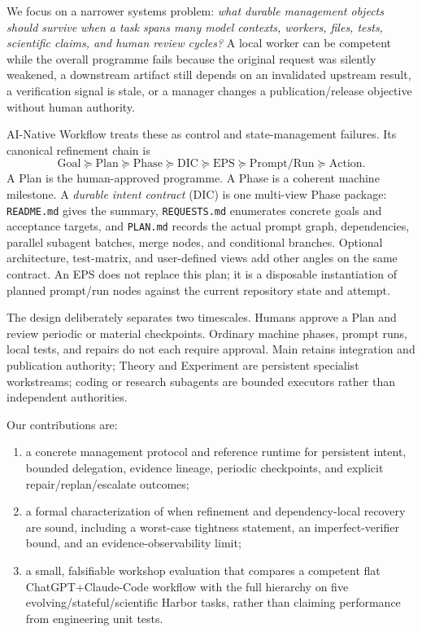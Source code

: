 \documentclass{article}
\begin{document}
We focus on a narrower systems problem: \emph{what durable management objects should survive when a task spans many model contexts, workers, files, tests, scientific claims, and human review cycles?} A local worker can be competent while the overall programme fails because the original request was silently weakened, a downstream artifact still depends on an invalidated upstream result, a verification signal is stale, or a manager changes a publication/release objective without human authority.

AI-Native Workflow treats these as control and state-management failures. Its canonical refinement chain is
\[
\text{Goal}\succeq\text{Plan}\succeq\text{Phase}\succeq\text{DIC}\succeq\text{EPS}\succeq\text{Prompt/Run}\succeq\text{Action}.
\]
A Plan is the human-approved programme. A Phase is a coherent machine milestone. A \emph{durable intent contract} (DIC) is one multi-view Phase package: \texttt{README.md} gives the summary, \texttt{REQUESTS.md} enumerates concrete goals and acceptance targets, and \texttt{PLAN.md} records the actual prompt graph, dependencies, parallel subagent batches, merge nodes, and conditional branches. Optional architecture, test-matrix, and user-defined views add other angles on the same contract. An EPS does not replace this plan; it is a disposable instantiation of planned prompt/run nodes against the current repository state and attempt.

The design deliberately separates two timescales. Humans approve a Plan and review periodic or material checkpoints. Ordinary machine phases, prompt runs, local tests, and repairs do not each require approval. Main retains integration and publication authority; Theory and Experiment are persistent specialist workstreams; coding or research subagents are bounded executors rather than independent authorities.

Our contributions are:
\begin{enumerate}
  \item a concrete management protocol and reference runtime for persistent intent, bounded delegation, evidence lineage, periodic checkpoints, and explicit repair/replan/escalate outcomes;
  \item a formal characterization of when refinement and dependency-local recovery are sound, including a worst-case tightness statement, an imperfect-verifier bound, and an evidence-observability limit;
  \item a small, falsifiable workshop evaluation that compares a competent flat ChatGPT+Claude-Code workflow with the full hierarchy on five evolving/stateful/scientific Harbor tasks, rather than claiming performance from engineering unit tests.
\end{enumerate}
\end{document}
